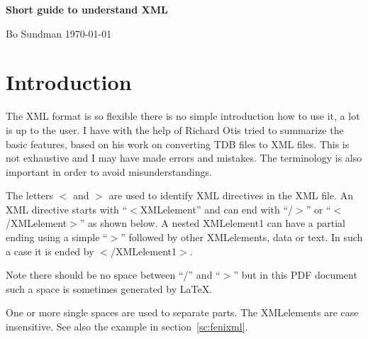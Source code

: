 \documentclass[12pt]{article}
\begin{document}
{\Large \bf Short guide to understand XML}

\bigskip
Bo Sundman \today

\section{Introduction}

The XML format is so flexible there is no simple introduction how to
use it, a lot is up to the user.  I have with the help of Richard Otis
tried to summarize the basic features, based on his work on converting
TDB files to XML files.  This is not exhaustive and I may have made
errors and mistakes.  The terminology is also important in order to
avoid misunderstandings.

The letters $<$ and $>$ are used to identify XML directives in the XML
file.  An XML directive starts with ``$<$XMLelement'' and can end with
``/$>$'' or ``$<$/XMLelement$>$'' as shown below.  A nested
XMLelement1 can have a partial ending using a simple ``$>$'' followed
by other XMLelements, data or text.  In such a case it is ended by
$<$/XMLelement1$>$.

Note there should be no space between ``/'' and ``$>$'' but in this
PDF document such a space is sometimes generated by LaTeX.

One or more single spaces are used to separate parts.  The XMLelements
are case insensitive.  See also the example in
section~\ref{sc:fenixml}.
\end{document}

